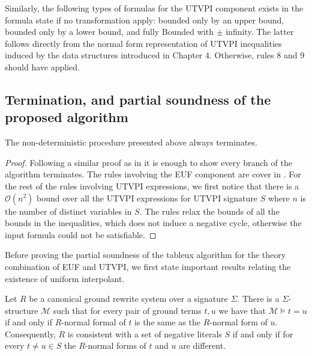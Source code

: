 Similarly, the following types of formulas for 
the UTVPI component exists in the
formula state if no transformation apply: bounded 
only by an upper bound, 
bounded only by a lower bound, and fully Bounded 
with $\pm$ infinity. The
latter follows directly from the normal 
form representation of UTVPI inequalities
induced by the data structures introduced 
in Chapter 4. Otherwise, rules
8 and 9 should have applied.

\subsection{Termination, and partial soundness of the
proposed algorithm}

\begin{lemma}
  The non-deterministic procedure presented above 
  always terminates.
\end{lemma}

\begin{proof}
  Following a similar proof as in \cite{ghilardi2020compactly}
  it is enough to show every branch of the algorithm terminates.
  The rules involving the EUF component are cover in
  \cite{ghilardi2020compactly}. For the rest of the rules
  involving UTVPI expressions, we first notice that there is a 
  $\mathcal{O}(n^2)$ bound over all the UTVPI expressions
  for UTVPI signature $S$ where $n$ is the number of distinct
  variables in $S$. The rules relax the bounds of all the
  bounds in the inequalities, which does not induce a negative
  cycle, otherwise the input formula could not be satisfiable.
\end{proof} 

Before proving the partial soundness of the tableux algorithm 
for the theory combination of EUF and UTVPI, we first state
important results relating the existence of uniform 
interpolant.

\begin{lemma} \cite{ghilardi2020compactly} \label{rewriting_model_existance}
  Let $R$ be a canonical ground rewrite system over a signature
  $\Sigma$. There is a $\Sigma$-structure $\mathcal{M}$
  such that for every pair of ground terms $t, u$ we have
  that $\mathcal{M} \models t = u$ if and only if 
  $R$-normal formal of $t$ is the same as the $R$-normal form of
  $u$. Consequently, $R$ is consistent with a set of negative 
  literals $S$ if and only if for every $t \neq u \in S$ 
  the $R$-normal forms of $t$ and $u$ are different.
\end{lemma}

